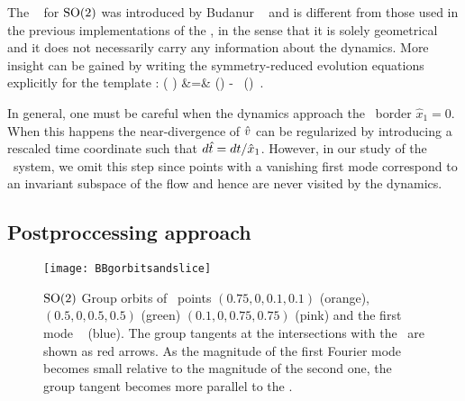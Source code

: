 The \template\  for $\textrm{SO}(2)$ was introduced by Budanur \etal~
and is different from those used in the previous implementations
of the \mslices, in the sense that it is solely geometrical and it does
not necessarily carry any information about the dynamics. More insight can be
gained by writing the symmetry-reduced evolution equations 
explicitly for the template :
\bea
\velRed ( \sspRed )          &=& \vel(\sspRed)
   -  \, \groupTan(\sspRed)
\label{e-so2red1stmode}
\,.
\eea


In general, one must be careful when the dynamics approach the \slice\ border $\hat{x}_1 = 0$. When this happens 
the near-divergence of $\hat{v}$ can be regularized by introducing a rescaled time coordinate such that
$d\hat{t} = dt / \hat{x}_1$. However, in our study of the \twoMode\ system, we omit this
step since points with a vanishing first mode correspond to an invariant subspace of the flow and hence are never visited by the dynamics.

\subsection{Postproccessing approach}
\label{s-slice2modes}


\begin{figure}%
\centering
 \texttt{[image: BBgorbitsandslice]}
\caption{$\textrm{SO}(2)$ Group orbits of \statesp\ points $(0.75, 0, 0.1, 0.1)$ (orange), $(0.5, 0, 0.5, 0.5)$ (green)
$(0.1, 0, 0.75, 0.75)$ (pink) and the first mode \slicePlane\
 (blue). The group tangents at the intersections with the \slicePlane\ are shown as red arrows.
As the magnitude of the first Fourier mode becomes small relative to the magnitude of the second one, the group tangent becomes more parallel to the \slicePlane.}
\label{fig:BBgorbitsandslice}
\end{figure}

